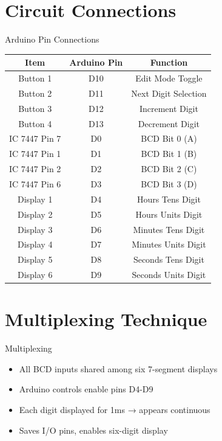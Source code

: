 \documentclass{beamer}
\begin{document}
\section{Circuit Connections}
\begin{frame}{Arduino Pin Connections}
\centering
\begin{tabular}{|c|c|c|}
\hline
Item & Arduino Pin & Function\\
\hline
Button 1 & D10 & Edit Mode Toggle\\
Button 2 & D11 & Next Digit Selection\\
Button 3 & D12 & Increment Digit\\
Button 4 & D13 & Decrement Digit\\
IC 7447 Pin 7 & D0 & BCD Bit 0 (A)\\
IC 7447 Pin 1 & D1 & BCD Bit 1 (B)\\
IC 7447 Pin 2 & D2 & BCD Bit 2 (C)\\
IC 7447 Pin 6 & D3 & BCD Bit 3 (D)\\
Display 1 & D4 & Hours Tens Digit\\
Display 2 & D5 & Hours Units Digit\\
Display 3 & D6 & Minutes Tens Digit\\
Display 4 & D7 & Minutes Units Digit\\
Display 5 & D8 & Seconds Tens Digit\\
Display 6 & D9 & Seconds Units Digit\\
\hline
\end{tabular}
\end{frame}

\section{Multiplexing Technique}
\begin{frame}{Multiplexing}
\begin{itemize}
    \item All BCD inputs shared among six 7-segment displays
    \item Arduino controls enable pins D4-D9
    \item Each digit displayed for 1ms → appears continuous
    \item Saves I/O pins, enables six-digit display
\end{itemize}
\end{frame}
\end{document}
